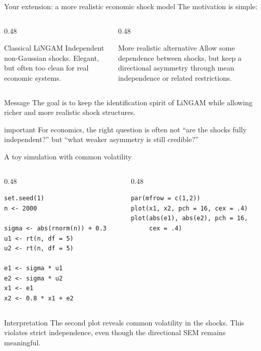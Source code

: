 \documentclass[dvipsnames,aspectratio=169,handout]{beamer}
\begin{document}
\begin{frame}{Your extension: a more realistic economic shock model}
The motivation is simple:

\begin{columns}[T]
\begin{column}{0.48\textwidth}
\begin{block}{Classical LiNGAM}
Independent non-Gaussian shocks.
Elegant, but often too clean for real economic systems.
\end{block}
\end{column}
\begin{column}{0.48\textwidth}
\begin{block}{More realistic alternative}
Allow some dependence between shocks, but keep a directional asymmetry through mean independence or related restrictions.
\end{block}
\end{column}
\end{columns}

\begin{alertblock}{Message}
The goal is to keep the identification spirit of LiNGAM while allowing richer and more realistic shock structures.
\end{alertblock}

\begin{beamercolorbox}[wd=\textwidth,sep=7pt,center,rounded=true,shadow=true]{important}
For economics, the right question is often not “are the shocks fully independent?” but “what weaker asymmetry is still credible?”
\end{beamercolorbox}
\end{frame}

\begin{frame}[fragile]{A toy simulation with common volatility}
\begin{columns}[T,onlytextwidth]
\begin{column}{0.48\textwidth}
\begin{lstlisting}
set.seed(1)
n <- 2000

sigma <- abs(rnorm(n)) + 0.3
u1 <- rt(n, df = 5)
u2 <- rt(n, df = 5)

e1 <- sigma * u1
e2 <- sigma * u2
x1 <- e1
x2 <- 0.8 * x1 + e2
\end{lstlisting}
\end{column}
\begin{column}{0.48\textwidth}
\begin{lstlisting}
par(mfrow = c(1,2))
plot(x1, x2, pch = 16, cex = .4)
plot(abs(e1), abs(e2), pch = 16,
     cex = .4)
\end{lstlisting}
\end{column}
\end{columns}

\begin{alertblock}{Interpretation}
The second plot reveals common volatility in the shocks. This violates strict independence, even though the directional SEM remains meaningful.
\end{alertblock}
\end{frame}
\end{document}

